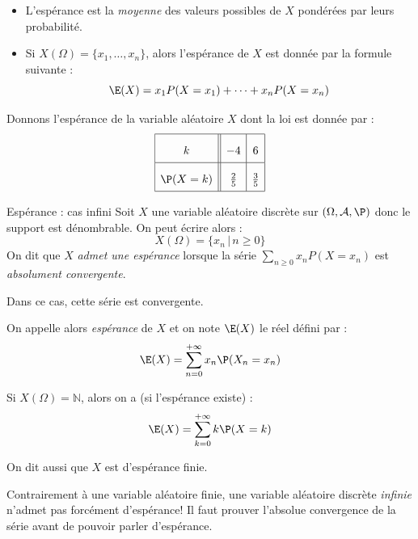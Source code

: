 \documentclass[french,11pt,twoside]{VcCours}
\begin{document}
\begin{Remarques}{}
\begin{itemize}
\item L'espérance est la \emph{moyenne} des valeurs possibles de $X$ pondérées par leurs probabilité.
\item Si $X(\Omega) = \{x_1,\ldots,x_n\}$, alors l'espérance de $X$ est donnée par la formule suivante :
 $$ \E(X) = x_1 P(X=x_1) + \cdots + x_n P(X=x_n)$$
\end{itemize}
\end{Remarques}

\begin{Exemple}{} Donnons l'espérance de la variable aléatoire $X$ dont la loi est donnée par :
$$\renewcommand{\arraystretch}{2.1}\begin{array}{|c||c|c|}
\hline
k & -4 & 6\\
\hline
\P(X=k) & \tfrac 2 5 & \tfrac 3 5\\
\hline
\end{array}$$

\vspace*{2cm}
\end{Exemple}


\begin{Definition}{Espérance : cas infini}
Soit $X$ une variable aléatoire discrète sur $(\Omega, \mathcal{A}, \P)$ donc le support est dénombrable. On peut écrire alors :
$$ X(\Omega) = \lbrace x_n \, \vert \, n \geq 0 \rbrace$$
On dit que $X$ \emph{admet une espérance} lorsque la série $\sum_{n \geq 0} x_n P(X=x_n)$ est \emph{absolument convergente}.


Dans ce cas, cette série est convergente.


On appelle alors \emph{espérance} de $X$ et on note $\E(X)$ le réel défini par :
$$\E(X) = \sum\limits_{n = 0}^{+ \infty} x_n \P(X_n=x_n ) $$
\end{Definition}

Si $X(\Omega)= \mathbb{N}$, alors on a (si l'espérance existe) :
$$\E(X) = \sum\limits_{k=0}^{+\infty} k \P(X=k)$$

\newpage

\begin{Remarque}{} On dit aussi que $X$ est d'espérance finie.
\end{Remarque}

\begin{Remarque}[\alerte]{} Contrairement à une variable aléatoire finie, une variable aléatoire discrète \emph{infinie} n'admet pas forcément d'espérance! Il faut prouver l'absolue convergence de la série avant de pouvoir parler d'espérance. 
\end{Remarque}
\end{document}
